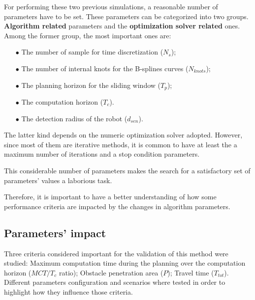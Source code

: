 For performing these two previous simulations, a reasonable number of parameters have to be set. These parameters can be categorized into two groups. \textbf{Algorithm related} parameters and the \textbf{optimization solver related} ones.
Among the former group, the most important ones are:
\begin{itemize}
\item[$\bullet$] The number of sample for time discretization ($N_s$);
\item[$\bullet$] The number of internal knots for the B-splines curves ($N_{knots}$);
\item[$\bullet$] The planning horizon for the sliding window ($T_p$);
\item[$\bullet$] The computation horizon ($T_c$).
\item[$\bullet$] The detection radius of the robot ($d_{sen}$).
\end{itemize}

The latter kind depends on the numeric optimization solver adopted.
However, since most of them are iterative methods, it is common
to have at least the a maximum number of iterations and a stop condition parameters.


This considerable number of parameters
makes the search for a
satisfactory set of parameters' values a laborious task.

Therefore, it is important to have a better understanding of how some
performance criteria are impacted by the changes in algorithm
parameters.

\subsection{Parameters' impact}

Three criteria considered important for the validation of this method were studied: {Maximum computation time} during the planning over the computation horizon ($MCT/T_c$ 
ratio); Obstacle penetration area ($P$); Travel time ($T_{tot}$).
Different parameters configuration and scenarios where tested in order to highlight
how they influence those criteria.
%
%
%
%
%


